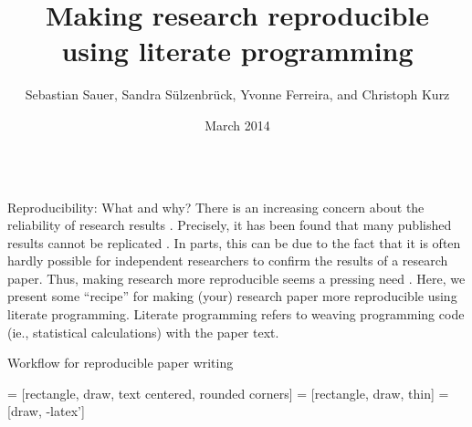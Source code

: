 \documentclass[final,hyperref={pdfpagelabels=false}]{beamer}
\title{Making research reproducible \\using literate programming}
\author{Sebastian Sauer, Sandra S\"ulzenbr\"uck, Yvonne Ferreira, and Christoph Kurz}
\institute{FOM University of Applied Sciences, Helmholtz Zentrum M\"unchen}
\date{March 2014}
\begin{document}
  \begin{frame}{} 
    
      \begin{columns}[t]
      
      \begin{column}{.48\linewidth}
      
        \begin{block}{Reproducibility: What and why?}
      There is an increasing concern about the reliability of research results \cite{Peng2015}.
    Precisely, it has been found that many published results cannot be replicated \cite{OpenScienceCollaboration2015}.
    In parts, this can be due to the fact that it is often hardly possible for independent researchers to
    confirm the results of a research paper. Thus, making research more reproducible seems a pressing need  \cite{Peng2015}.
    Here, we present some ``recipe'' for making (your) research paper more reproducible using literate programming.
    Literate programming refers to weaving programming code (ie., statistical calculations) with the paper text.        
    
    \end{block}
      
      
      
            \begin{block}{Workflow for reproducible paper writing}
         
      \begin{minipage}[t]{0.45\textwidth}
       = [rectangle, draw, text centered, rounded corners]
       = [rectangle, draw, thin]
       = [draw, -latex']
      \begin{tikzpicture}[node distance=7cm, auto]
        

\end{tikzpicture}
\end{minipage}
\end{block}
\end{column}
\end{columns}
\end{frame}
\end{document}
